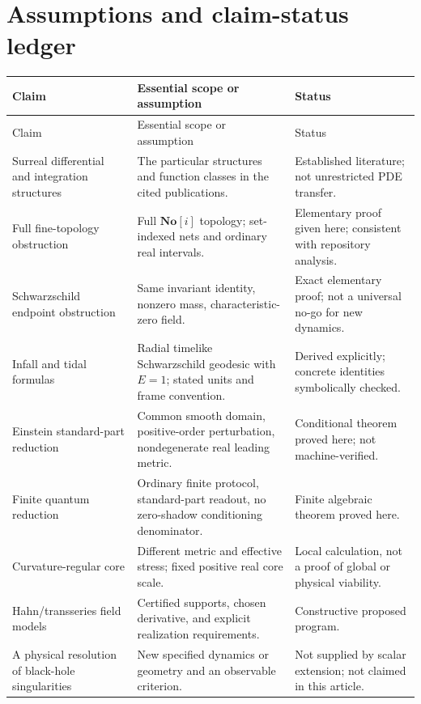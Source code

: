 \documentclass[11pt,a4paper]{article}
\numberwithin{equation}{section}
\theoremstyle{definition}
\theoremstyle{remark}
\newcommand{\No}{\mathbf{No}}
\begin{document}
\clearpage
\section{Assumptions and claim-status ledger}
\label{app:ledger}

\begin{longtable}{@{}>{\raggedright\arraybackslash}p{}>{\raggedright\arraybackslash}p{}>{\raggedright\arraybackslash}p{}@{}}
\toprule
Claim & Essential scope or assumption & Status \\
\midrule
\endfirsthead
\toprule
Claim & Essential scope or assumption & Status \\
\midrule
\endhead
Surreal differential and integration structures & The particular structures and function classes in the cited publications. & Established literature; not unrestricted PDE transfer. \\
\addlinespace
Full fine-topology obstruction & Full $\No[i]$ topology; set-indexed nets and ordinary real intervals. & Elementary proof given here; consistent with repository analysis. \\
\addlinespace
Schwarzschild endpoint obstruction & Same invariant identity, nonzero mass, characteristic-zero field. & Exact elementary proof; not a universal no-go for new dynamics. \\
\addlinespace
Infall and tidal formulas & Radial timelike Schwarzschild geodesic with $E=1$; stated units and frame convention. & Derived explicitly; concrete identities symbolically checked. \\
\addlinespace
Einstein standard-part reduction & Common smooth domain, positive-order perturbation, nondegenerate real leading metric. & Conditional theorem proved here; not machine-verified. \\
\addlinespace
Finite quantum reduction & Ordinary finite protocol, standard-part readout, no zero-shadow conditioning denominator. & Finite algebraic theorem proved here. \\
\addlinespace
Curvature-regular core & Different metric and effective stress; fixed positive real core scale. & Local calculation, not a proof of global or physical viability. \\
\addlinespace
Hahn/transseries field models & Certified supports, chosen derivative, and explicit realization requirements. & Constructive proposed program. \\
\addlinespace
A physical resolution of black-hole singularities & New specified dynamics or geometry and an observable criterion. & Not supplied by scalar extension; not claimed in this article. \\
\bottomrule
\end{longtable}
\end{document}
